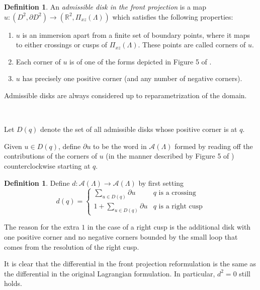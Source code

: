 \documentclass[a4paper,final, reqno]{amsart}
\theoremstyle{plain}
\theoremstyle{definition}
\newtheorem{Def}[Th]{Definition}
\newcommand{\A}{\mathcal{A}}
\begin{document}
	\begin{Def}\label{def:frprojdisk}
		An \emph{admissible disk in the front projection} is a map $u: (D^2, \partial D^2) \to (\mathbb{R}^2, \Pi_{xz}(\Lambda))$ which satisfies the following properties:
		
		\begin{enumerate}
			\item $u$ is an immersion apart from a finite set of boundary points, where it maps to either crossings or cusps of $\Pi_{xz}(\Lambda)$. These points are called corners of $u$.
			\item Each corner of $u$ is of one of the forms depicted in Figure 5 of \cite{ngres}.
			\item $u$ has precisely one positive corner (and any number of negative corners).
		\end{enumerate}
		
		Admissible disks are always considered up to reparametrization of the domain.
		
		\-\
		
		Let $D(q)$ denote the set of all admissible disks whose positive corner is at $q$. 
		
		Given $u \in D(q)$, define $\partial u$ to be the word in $\A(\Lambda)$ formed by reading off the contributions of the corners of $u$ (in the manner described by Figure 5 of \cite{ngres}) counterclockwise starting at $q$.
	\end{Def}
	
	
	
	\begin{Def}\label{def:cedifffront}
		Define $d: \A(\Lambda) \to \A(\Lambda)$ by first setting
		\[ d (q) = \begin{cases}
			\sum_{u\in D(q)} \partial u & q \text{ is a crossing} \\ 
			1 + \sum_{u \in D(q)} \partial u & q \text{ is a right cusp}
		\end{cases}  \]
		
	\end{Def}
	The reason for the extra $1$ in the case of a right cusp is the additional disk with one positive corner and no negative corners bounded by the small loop that comes from the resolution of the right cusp.
	
	It is clear that the differential in the front projection reformulation is the same as the differential in the original Lagrangian formulation. In particular, $d^2=0$ still holds.
	
	\-\
	
\end{document}
